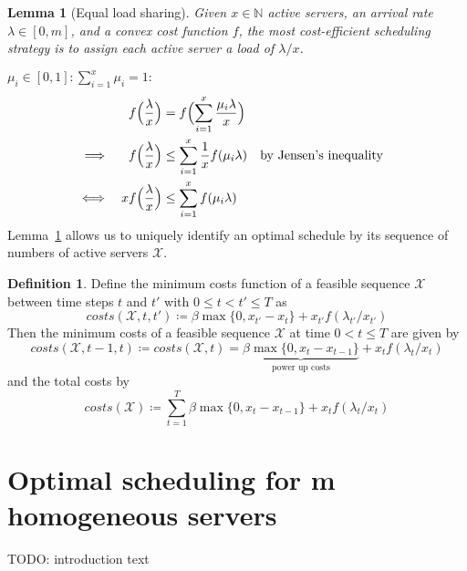 \documentclass[hidelinks]{article}
\makeatletter
\renewenvironment{proof}[1][\proofname]{\par
  \vspace{-\parskip}%
  \pushQED{\qed}%
  \normalfont
  \topsep0pt \partopsep0pt %
  \trivlist
  \item[\hskip\labelsep
        \itshape
    #1\@addpunct{.}]\ignorespaces
}{%
  \popQED\endtrivlist\@endpefalse
  \addvspace{6pt plus 6pt} %
}
\theoremstyle{plain}
\newtheorem{lem}[thm]{Lemma}
\theoremstyle{definition}
\newtheorem{defn}[thm]{Definition}
\theoremstyle{rem}
\newcommand{\mx}{\mathcal{X}}
\makeatother
\begin{document}
\begin{lem}[Equal load sharing]\label{lem:share}
Given $x\in\mathbb{N}$ active servers, an arrival rate $\lambda\in[0,m]$, and a convex cost function $f$, the most cost-efficient scheduling strategy is to assign each active server a load of $\lambda/x$.
\end{lem}
\begin{proof}

$\mu_i\in[0,1]:\sum\limits_{i=1}^{x}{\mu_i}=1:$
\begin{align*}
	&&f\Bigl(\frac{\lambda}{x}\Bigr)&=f\Bigl(\sum\limits_{i=1}^x{\frac{\mu_i\lambda}{x}}\Bigr)\\
	\implies&&f\Bigl(\frac{\lambda}{x}\Bigr)&\le\sum\limits_{i=1}^x\frac{1}{x}f(\mu_i\lambda)&&\text{by Jensen's inequality}\\
	\iff&& xf\Bigl(\frac{\lambda}{x}\Bigr)&\le\sum\limits_{i=1}^xf(\mu_i\lambda)
\end{align*}
\end{proof}
Lemma~\ref{lem:share} allows us to uniquely identify an optimal schedule by its sequence of numbers of active servers $\mx$. 
\begin{defn}
Define the minimum costs function of a feasible sequence $\mx$ between time steps $t$ and $t'$ with $0\le t<t'\le T$ as
\begin{equation}
	costs(\mx,t,t')\coloneqq\beta\max\{0,x_{t'}-x_t\}+x_{t'}f(\lambda_{t'}/x_{t'})\label{eq:costs_chi_t_t_prime}
\end{equation}
Then the minimum costs of a feasible sequence $\mx$ at time $0<t\le T$ are given by
\begin{equation*}
	costs(\mx,t-1,t)\coloneqq costs(\mx,t)=\underbrace{\beta\max\{0,x_{t}-x_{t-1}\}}_{\text{power up costs}}+x_tf(\lambda_t/x_t)
\end{equation*}
and the total costs by
\begin{equation*}
	costs(\mx)\coloneqq\sum\limits_{t=1}^{T}{\beta\max\{0,x_{t}-x_{t-1}\}+x_tf(\lambda_t/x_t)}
\end{equation*}
\end{defn}

\section{Optimal scheduling for m homogeneous servers}\label{sec:opt}
TODO: introduction text
\end{document}
